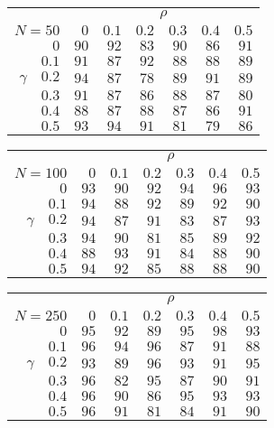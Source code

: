 \begin{tabular}{r|rrrrrr}
\hline\hline
 &\multicolumn{6}{c}{$\rho$} \\ 
 $N = 50$ & $0$ & $0.1$ & $0.2$ & $0.3$ & $0.4$ & $0.5$ \\ 
 \hline$0$ & $90$ & $92$ & $83$ & $90$ & $86$ & $91$\\ 
$0.1$ & $91$ & $87$ & $92$ & $88$ & $88$ & $89$\\ 
$\gamma\quad$$0.2$ & $94$ & $87$ & $78$ & $89$ & $91$ & $89$\\ 
$0.3$ & $91$ & $87$ & $86$ & $88$ & $87$ & $80$\\ 
$0.4$ & $88$ & $87$ & $88$ & $87$ & $86$ & $91$\\ 
$0.5$ & $93$ & $94$ & $91$ & $81$ & $79$ & $86$\\ 
 \hline 
 \end{tabular}
 
 \vspace{2em} 
 
\begin{tabular}{r|rrrrrr}
\hline\hline
 &\multicolumn{6}{c}{$\rho$} \\ 
 $N = 100$ & $0$ & $0.1$ & $0.2$ & $0.3$ & $0.4$ & $0.5$ \\ 
 \hline$0$ & $93$ & $90$ & $92$ & $94$ & $96$ & $93$\\ 
$0.1$ & $94$ & $88$ & $92$ & $89$ & $92$ & $90$\\ 
$\gamma\quad$$0.2$ & $94$ & $87$ & $91$ & $83$ & $87$ & $93$\\ 
$0.3$ & $94$ & $90$ & $81$ & $85$ & $89$ & $92$\\ 
$0.4$ & $88$ & $93$ & $91$ & $84$ & $88$ & $90$\\ 
$0.5$ & $94$ & $92$ & $85$ & $88$ & $88$ & $90$\\ 
 \hline 
 \end{tabular}
 
 \vspace{2em} 
 
\begin{tabular}{r|rrrrrr}
\hline\hline
 &\multicolumn{6}{c}{$\rho$} \\ 
 $N = 250$ & $0$ & $0.1$ & $0.2$ & $0.3$ & $0.4$ & $0.5$ \\ 
 \hline$0$ & $95$ & $92$ & $89$ & $95$ & $98$ & $93$\\ 
$0.1$ & $96$ & $94$ & $96$ & $87$ & $91$ & $88$\\ 
$\gamma\quad$$0.2$ & $93$ & $89$ & $96$ & $93$ & $91$ & $95$\\ 
$0.3$ & $96$ & $82$ & $95$ & $87$ & $90$ & $91$\\ 
$0.4$ & $96$ & $90$ & $86$ & $95$ & $93$ & $93$\\ 
$0.5$ & $96$ & $91$ & $81$ & $84$ & $91$ & $90$\\ 
 \hline 
 \end{tabular}